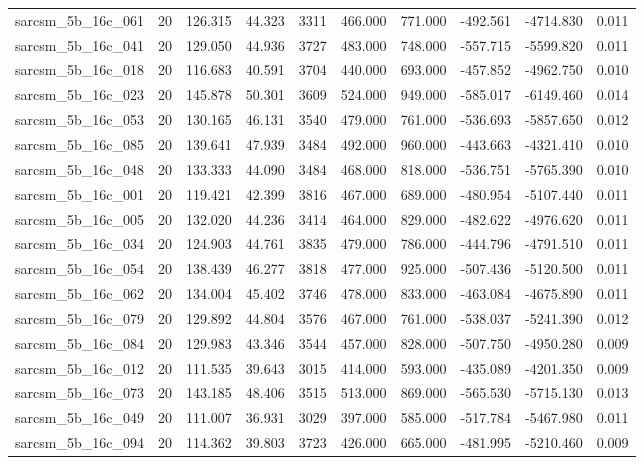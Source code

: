 \begin{tabular}{lrrrrrrrrr}
sarcsm\_5b\_16c\_061 & 20 & 126.315 & 44.323 & 3311 & 466.000 & 771.000 & -492.561 & -4714.830 & 0.011 \\
sarcsm\_5b\_16c\_041 & 20 & 129.050 & 44.936 & 3727 & 483.000 & 748.000 & -557.715 & -5599.820 & 0.011 \\
sarcsm\_5b\_16c\_018 & 20 & 116.683 & 40.591 & 3704 & 440.000 & 693.000 & -457.852 & -4962.750 & 0.010 \\
sarcsm\_5b\_16c\_023 & 20 & 145.878 & 50.301 & 3609 & 524.000 & 949.000 & -585.017 & -6149.460 & 0.014 \\
sarcsm\_5b\_16c\_053 & 20 & 130.165 & 46.131 & 3540 & 479.000 & 761.000 & -536.693 & -5857.650 & 0.012 \\
sarcsm\_5b\_16c\_085 & 20 & 139.641 & 47.939 & 3484 & 492.000 & 960.000 & -443.663 & -4321.410 & 0.010 \\
sarcsm\_5b\_16c\_048 & 20 & 133.333 & 44.090 & 3484 & 468.000 & 818.000 & -536.751 & -5765.390 & 0.010 \\
sarcsm\_5b\_16c\_001 & 20 & 119.421 & 42.399 & 3816 & 467.000 & 689.000 & -480.954 & -5107.440 & 0.011 \\
sarcsm\_5b\_16c\_005 & 20 & 132.020 & 44.236 & 3414 & 464.000 & 829.000 & -482.622 & -4976.620 & 0.011 \\
sarcsm\_5b\_16c\_034 & 20 & 124.903 & 44.761 & 3835 & 479.000 & 786.000 & -444.796 & -4791.510 & 0.011 \\
sarcsm\_5b\_16c\_054 & 20 & 138.439 & 46.277 & 3818 & 477.000 & 925.000 & -507.436 & -5120.500 & 0.011 \\
sarcsm\_5b\_16c\_062 & 20 & 134.004 & 45.402 & 3746 & 478.000 & 833.000 & -463.084 & -4675.890 & 0.011 \\
sarcsm\_5b\_16c\_079 & 20 & 129.892 & 44.804 & 3576 & 467.000 & 761.000 & -538.037 & -5241.390 & 0.012 \\
sarcsm\_5b\_16c\_084 & 20 & 129.983 & 43.346 & 3544 & 457.000 & 828.000 & -507.750 & -4950.280 & 0.009 \\
sarcsm\_5b\_16c\_012 & 20 & 111.535 & 39.643 & 3015 & 414.000 & 593.000 & -435.089 & -4201.350 & 0.009 \\
sarcsm\_5b\_16c\_073 & 20 & 143.185 & 48.406 & 3515 & 513.000 & 869.000 & -565.530 & -5715.130 & 0.013 \\
sarcsm\_5b\_16c\_049 & 20 & 111.007 & 36.931 & 3029 & 397.000 & 585.000 & -517.784 & -5467.980 & 0.011 \\
sarcsm\_5b\_16c\_094 & 20 & 114.362 & 39.803 & 3723 & 426.000 & 665.000 & -481.995 & -5210.460 & 0.009 \\

\end{tabular}
